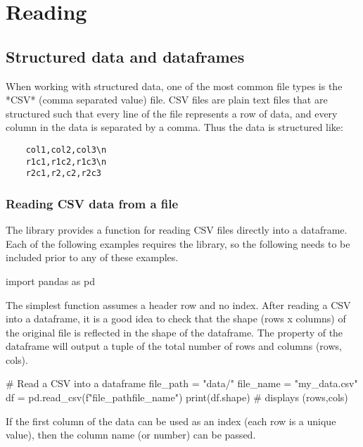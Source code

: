 \chapter{Reading}
\label{chapter:reading}

\section{Structured data and dataframes}

When working with structured data, one of the most common file types is the *CSV* (comma separated value) file. CSV files are plain text files that are structured such that every line of the file represents a row of data, and every column in the data is separated by a comma. Thus the data is structured like:

\begin{verbatim}
    col1,col2,col3\n
    r1c1,r1c2,r1c3\n
    r2c1,r2,c2,r2c3
\end{verbatim}

\subsection{Reading CSV data from a file}

The  library provides a function for reading CSV files directly into a dataframe.
Each of the following examples requires the library, so the following  needs to be included prior to any of these examples.

\begin{pycode}
    import pandas as pd
\end{pycode}

The simplest  function assumes a header row and no index. After reading a CSV into a dataframe, it is a good idea to check that the shape (rows x columns) of the original  file is reflected in the shape of the dataframe. The  property of the dataframe will output a tuple of the total number of rows and columns (rows, cols).

\begin{pycode}
    # Read a CSV into a dataframe
    file_path = "data/"
    file_name = "my_data.csv"
    df = pd.read_csv(f"{file_path}{file_name}")
    print(df.shape) # displays (rows,cols)
\end{pycode}

If the first column of the data can be used as an index (each row is a unique value), then the column name (or number) can be passed.

